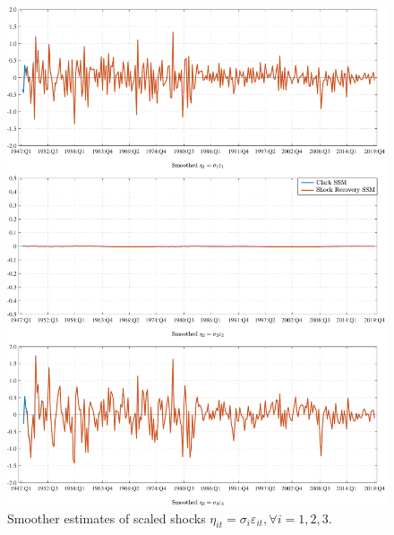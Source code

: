 \documentclass[a4paper,final,12pt]{article}
\begin{document}
\begin{figure}[p!]
\centering
\includegraphics[angle=00, width=1\textwidth,trim={0 0 0 0},clip]{Clark_SSM_Smoothed.pdf} \vspace*{-2.5mm}
\caption{Smoother estimates of scaled shocks $\eta_{it} = \sigma_i\varepsilon_{it}, \forall i=1,2,3$.}
\label{fig:KS}
\end{figure}
\end{document}
